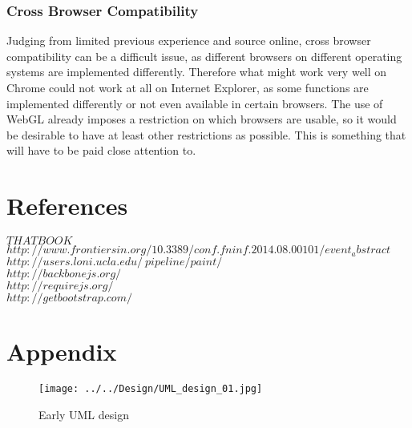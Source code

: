 \documentclass[a4paper,11pt,titlepage]{article}
\begin{document}
\subsubsection{Cross Browser Compatibility}

Judging from limited previous experience and source online, cross browser compatibility can be a difficult issue, as different browsers on different operating systems are implemented differently. Therefore what might work very well on Chrome could not work at all on Internet Explorer, as some functions are implemented differently or not even available in certain browsers. The use of WebGL already imposes a restriction on which browsers are usable, so it would be desirable to have at least other restrictions as possible. This is something that will have to be paid close attention to.


\section{References}
$THAT BOOK$\\
$http://www.frontiersin.org/10.3389/conf.fninf.2014.08.00101/event_abstract$\\
$http://users.loni.ucla.edu/~pipeline/paint/$\\
$http://backbonejs.org/$\\
$http://requirejs.org/$\\
$http://getbootstrap.com/$\\

\section{Appendix}


\begin{figure}[ht!]
\centering
\texttt{[image: ../../Design/UML\_design\_01.jpg]}
\caption{Early UML design}
\label{fig:UIdesign1}
\end{figure}


\begin{figure}[ht]
\end{figure}
\end{document}
